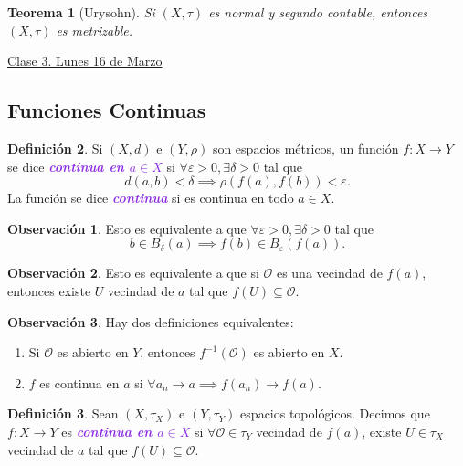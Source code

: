 \documentclass{article}
\newtheorem{theorem}{Teorema}[subsection]
\theoremstyle{definition}
\newtheorem{definition}[theorem]{Definición}
\newtheorem*{obs}{Observación}
\theoremstyle{remark}
\numberwithin{equation}{section}
\renewcommand{\O}{\mathcal{O}}
\newcommand{\e}{\varepsilon}
\renewcommand{\t}{\tau}
\newcommand{\wea}[1]{\textcolor{BlueViolet}{\textbf{\emph{#1}}}}
\newcommand{\fecha}[1]{\begin{flushright} \underline{#1} \end{flushright}}
\begin{document}
\begin{theorem}
  [Urysohn]
  Si $(X,\t)$ es normal y segundo contable, entonces $(X,\t)$ es metrizable.
\end{theorem}

\newpage
\fecha{Clase 3. Lunes 16 de Marzo}
\subsection{Funciones Continuas}

\begin{definition}
  Si $(X,d)$ e $(Y,\rho)$ son espacios métricos, un función $f \colon X \to Y$ se dice \wea{continua en $a \in X$} si $\forall \e>0, \exists \delta>0$ tal que $$d(a,b) < \delta \implies \rho(f(a),f(b)) < \e.$$
  La función se dice \wea{continua} si es continua en todo $a \in X$.
\end{definition}

\begin{obs}
  Esto es equivalente a que $\forall \e>0, \exists \delta>0$ tal que $$b \in B_\delta(a) \implies f(b) \in B_\e(f(a)).$$
\end{obs}

\begin{obs}
  Esto es equivalente a que si $\O$ es una vecindad de $f(a)$, entonces existe $U$ vecindad de $a$ tal que $f(U) \subseteq \O$.
\end{obs}

\begin{obs}
  Hay dos definiciones equivalentes:
  \begin{enumerate}[(1)]
    \item Si $\O$ es abierto en $Y$, entonces $f^{-1}(\O)$ es abierto en $X$.
    \item $f$ es continua en $a$ si $\forall a_n \to a \implies f(a_n) \to f(a)$.
  \end{enumerate}
\end{obs}

\begin{definition}
  Sean $(X,\t_X)$ e $(Y,\t_Y)$ espacios topológicos. Decimos que $f \colon X \to Y$ es \wea{continua en $a \in X$} si $\forall \O \in \t_Y$ vecindad de $f(a)$, existe $U \in \t_X$ vecindad de $a$ tal que $f(U) \subseteq \O$.
\end{definition}
\end{document}

